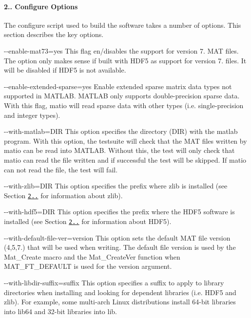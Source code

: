 \paragraph*{2.. Configure Options}

The configure script used to build the software takes a number of options. This section describes the key options.


\begin{DoxyItemize}
\item {\ttfamily -\/-\/enable-\/mat73=yes} This flag en/disables the support for version 7. M\+AT files. The option only makes sense if built with H\+D\+F5 as support for version 7. files. It will be disabled if H\+D\+F5 is not available.
\item {\ttfamily -\/-\/enable-\/extended-\/sparse=yes} Enable extended sparse matrix data types not supported in M\+A\+T\+L\+AB. M\+A\+T\+L\+AB only supports double-\/precision sparse data. With this flag, matio will read sparse data with other types (i.\+e. single-\/precision and integer types).
\item {\ttfamily -\/-\/with-\/matlab=D\+IR} This option specifies the directory (D\+IR) with the \textquotesingle{}matlab\textquotesingle{} program. With this option, the testsuite will check that the M\+AT files written by matio can be read into M\+A\+T\+L\+AB. Without this, the test will only check that matio can read the file written and if successful the test will be skipped. If matio can not read the file, the test will fail.
\item {\ttfamily -\/-\/with-\/zlib=D\+IR} This option specifies the prefix where zlib is installed (see Section \href{#211-zlib}{\tt 2..} for information about zlib).
\item {\ttfamily -\/-\/with-\/hdf5=D\+IR} This option specifies the prefix where the H\+D\+F5 software is installed (see Section \href{#212-hdf5}{\tt 2..} for information about H\+D\+F5).
\item {\ttfamily -\/-\/with-\/default-\/file-\/ver=version} This option sets the default M\+AT file version (4,5,7.) that will be used when writing. The default file version is used by the Mat\+\_\+\+Create macro and the Mat\+\_\+\+Create\+Ver function when M\+A\+T\+\_\+\+F\+T\+\_\+\+D\+E\+F\+A\+U\+LT is used for the version argument.
\item {\ttfamily -\/-\/with-\/libdir-\/suffix=suffix} This option specifies a suffix to apply to library directories when installing and looking for dependent libraries (i.\+e. H\+D\+F5 and zlib). For example, some multi-\/arch Linux distributions install 64-\/bit libraries into lib64 and 32-\/bit libraries into lib.
\end{DoxyItemize}

